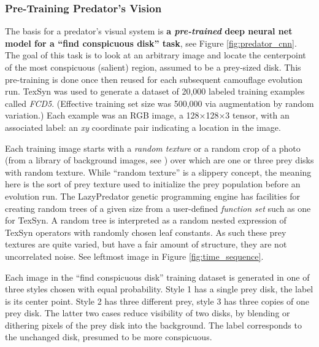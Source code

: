 \documentclass[letterpaper]{article}
\newcommand{\jargon}[1]{\textit{#1}}
\newcommand{\texsyn}[0]{TexSyn}
\newcommand{\lazypredator}[0]{LazyPredator}
\begin{document}
\subsubsection{Pre-Training Predator's Vision}
\label{sec:pre_train_predator}
The basis for a predator's visual system is \textbf{a \jargon{pre-trained} deep neural net model for a “find conspicuous disk” task}, see Figure \ref{fig:predator_cnn}. The goal of this task is to look at an arbitrary image and locate the centerpoint of the most conspicuous (salient) region, assumed to be a prey-sized disk. This pre-training is done once then reused for each subsequent camouflage evolution run. \texsyn{} was used to generate a dataset of 20,000 labeled training examples called \jargon{FCD5}. (Effective training set size was 500,000 via augmentation by random variation.) Each example was an RGB image, a 128×128×3 tensor, with an associated label: an \textit{xy} coordinate pair indicating a location in the image.
\par
Each training image starts with a \jargon{random texture} or a random crop of a photo (from a library of background images, see ) over which are one or three prey disks with random texture. While “random texture” is a slippery concept, the meaning here is the sort of prey texture used to initialize the prey population before an evolution run. The \lazypredator{} genetic programming engine has facilities for creating random trees of a given size from a user-defined \jargon{function set} such as one for \texsyn{}. A random tree is interpreted as a random nested expression of \texsyn{} operators with randomly chosen leaf constants. As such these prey textures are quite varied, but have a fair amount of structure, they are not uncorrelated noise. See leftmost image in Figure \ref{fig:time_sequence}.
\par
Each image in the “find conspicuous disk” training dataset is generated in one of three styles chosen with equal probability. Style 1 has a single prey disk, the label is its center point. Style 2 has three different prey, style 3 has three copies of one prey disk. The latter two cases reduce visibility of two disks, by blending or dithering pixels of the prey disk into the background. The label corresponds to the unchanged disk, presumed to be more conspicuous.
\par
\end{document}
